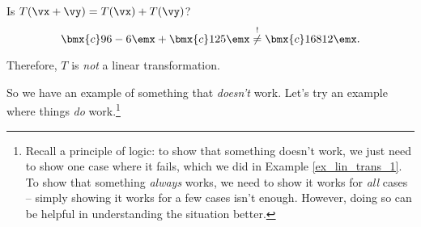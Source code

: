 {\begin{enumerate}

	Is $T(\vx+\vy) = T(\vx)+T(\vy)$? $$\bmx{c} 9\\6\\-6\emx+\bmx{c} 1\\2\\5\emx \overset{!}{\neq} \bmx{c} 16\\8\\12\emx.$$
	\end{enumerate}
	
	Therefore, $T$ is \textit{not} a linear transformation.
}

So we have an example of something that \textit{doesn't} work. Let's try an example where things \textit{do} work.\footnote{Recall a principle of logic: to show that something doesn't work, we just need to show one case where it fails, which we did in Example \ref{ex_lin_trans_1}. To show that something \textit{always} works, we need to show it works for \textit{all} cases -- simply showing it works for a few cases isn't enough. However, doing so can be helpful in understanding the situation better.}\\

